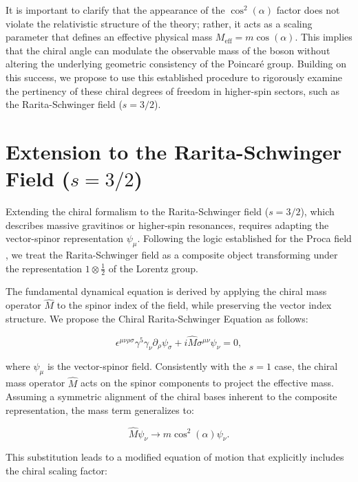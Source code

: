It is important to clarify that the appearance of the $\cos^2(\alpha)$ factor does not violate the relativistic structure of the theory; rather, it acts as a scaling parameter that defines an effective physical mass $M_{\text{eff}} = m \cos(\alpha)$. This implies that the chiral angle can modulate the observable mass of the boson without altering the underlying geometric consistency of the Poincaré group. Building on this success, we propose to use this established procedure to rigorously examine the pertinency of these chiral degrees of freedom in higher-spin sectors, such as the Rarita-Schwinger field ($s=3/2$).


\section*{Extension to the Rarita-Schwinger Field ($s=3/2$)}

Extending the chiral formalism to the Rarita-Schwinger field ($s=3/2$), which describes massive gravitinos or higher-spin resonances, requires adapting the vector-spinor representation $\psi_\mu$. Following the logic established for the Proca field \cite{Watson2022}, we treat the Rarita-Schwinger field as a composite object transforming under the representation $1 \otimes \frac{1}{2}$ of the Lorentz group.

The fundamental dynamical equation is derived by applying the chiral mass operator $\hat{M}$ to the spinor index of the field, while preserving the vector index structure. We propose the Chiral Rarita-Schwinger Equation as follows:

\begin{equation}
    \epsilon^{\mu\nu\rho\sigma} \gamma^5 \gamma_\nu \partial_\rho \psi_\sigma + i \hat{M} \sigma^{\mu\nu} \psi_\nu = 0,
\end{equation}

where $\psi_\mu$ is the vector-spinor field. Consistently with the $s=1$ case, the chiral mass operator $\hat{M}$ acts on the spinor components to project the effective mass. Assuming a symmetric alignment of the chiral bases inherent to the composite representation, the mass term generalizes to:

\begin{equation}
    \hat{M} \psi_\nu \rightarrow m \cos^2(\alpha) \psi_\nu.
\end{equation}

This substitution leads to a modified equation of motion that explicitly includes the chiral scaling factor:

